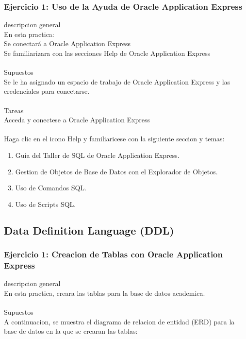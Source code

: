 \documentclass[12pt,letterpaper]{article}
\begin{document}
\subsubsection{Ejercicio 1: Uso de la Ayuda de Oracle Application Express} 
descripcion general  \\
En esta practica:\\
 Se conectará a Oracle Application Express\\
 Se familiarizara con las secciones Help de Oracle Application Express \\
 \\
Supuestos\\
Se le ha asignado un espacio de trabajo de Oracle Application Express y las credenciales para conectarse.\\
\\
Tareas\\
Acceda y conectese a Oracle Application Express
\\
\\
Haga clic en el icono Help y familiaricese con la siguiente seccion y temas: \\
\begin{enumerate}[1.]
    \item  Guia del Taller de SQL de Oracle Application Express. 
     
    \item Gestion de Objetos de Base de Datos con el Explorador de Objetos.
    
    \item Uso de Comandos SQL.
    
     \item Uso de Scripts SQL.
    
    
		\end{enumerate}
		




\newpage
\subsection{Data Definition Language (DDL)} 

\subsubsection{Ejercicio 1: Creacion de Tablas con Oracle Application Express} 
descripcion general  \\
En esta practica, creara las tablas para la base de datos academica. \\
 \\
Supuestos\\
A continuacion, se muestra el diagrama de relacion de entidad (ERD) para la base de datos en la que se crearan las tablas:\\
\end{document}
